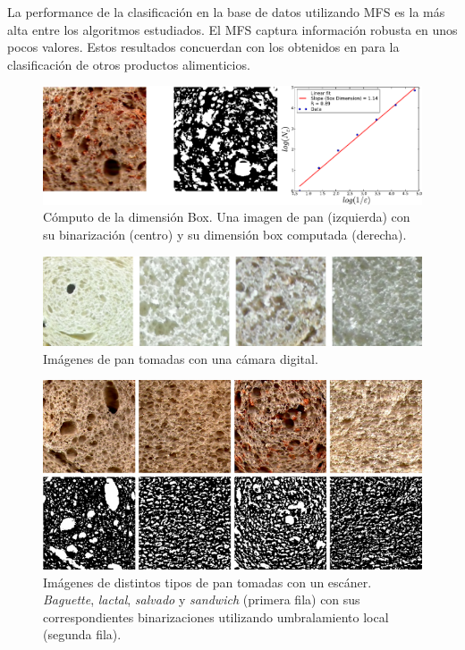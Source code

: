 La performance de la clasificación en la base de datos utilizando MFS es la más alta entre los algoritmos estudiados.
El MFS captura información robusta en unos pocos valores.
Estos resultados concuerdan con los obtenidos en \cite{Bosch2011} para la clasificación de otros productos alimenticios.

\begin{figure}[h!]
\centering
\includegraphics[width=13cm]{dimensionbox}
\caption[Cómputo de la dimensión Box]{Cómputo de la dimensión Box. Una imagen de pan (izquierda) con su binarización (centro) y su dimensión box computada (derecha).}
\label{fig:fitbox}
\end{figure}

\begin{figure}[h!]
\centering
\includegraphics[width=13cm]{pancamara}
\caption{Imágenes de pan tomadas con una cámara digital.}
\label{fig:camera}
\end{figure}

\begin{figure}[h!]
\centering
\includegraphics[width=13cm]{binarizaciones}
\caption{Imágenes de distintos tipos de pan tomadas con un escáner. {\em Baguette}, {\em lactal}, {\em salvado} y {\em sandwich} (primera fila) con sus correspondientes binarizaciones utilizando umbralamiento local (segunda fila).}
\label{fig:bread}
\end{figure}

